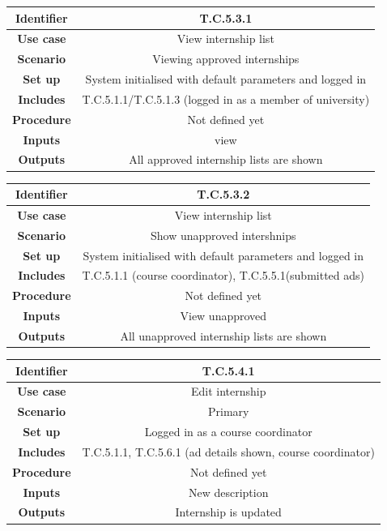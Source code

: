 \documentclass{l3deliverable}
\begin{document}
\begin{tabular}{|c|c|}
\hline \textbf{Identifier} & T.C.5.3.1 \\
\hline \textbf{Use case} & View internship list\\
\hline \textbf{Scenario} & Viewing approved internships\\
\hline \textbf{Set up} & System initialised with default parameters and logged in\\
\hline \textbf{Includes} & T.C.5.1.1/T.C.5.1.3 (logged in as a member of university)\\
\hline \textbf{Procedure} & Not defined yet\\
\hline \textbf{Inputs} & view\\
\hline \textbf{Outputs} & All approved internship lists are shown\\
\hline
\end{tabular}

\begin{tabular}{|c|c|}
\hline \textbf{Identifier} & T.C.5.3.2 \\
\hline \textbf{Use case} & View internship list\\
\hline \textbf{Scenario} & Show unapproved intershnips\\
\hline \textbf{Set up} & System initialised with default parameters and logged in\\
\hline \textbf{Includes} &T.C.5.1.1 (course coordinator), T.C.5.5.1(submitted ads)\\
\hline \textbf{Procedure} & Not defined yet\\
\hline \textbf{Inputs} & View unapproved\\
\hline \textbf{Outputs} & All unapproved internship lists are shown\\
\hline
\end{tabular}

\begin{tabular}{|c|c|}
\hline \textbf{Identifier} & T.C.5.4.1 \\
\hline \textbf{Use case} & Edit internship\\
\hline \textbf{Scenario} & Primary\\
\hline \textbf{Set up} & Logged in as a course coordinator\\
\hline \textbf{Includes} & T.C.5.1.1, T.C.5.6.1 (ad details shown, course coordinator)\\
\hline \textbf{Procedure} & Not defined yet \\
\hline \textbf{Inputs} & New description\\
\hline \textbf{Outputs} & Internship is updated\\
\hline
\end{tabular}
\end{document}
